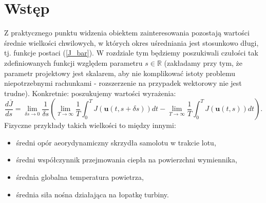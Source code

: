 \documentclass[12pt, twoside]{book}
\begin{document}
\section{Wstęp}
Z praktycznego punktu widzenia obiektem zainteresowania pozostają wartości średnie wielkości chwilowych, w których okres uśredniania jest stosunkowo długi, tj. funkcje postaci (\ref{J_bar}). W rozdziale tym będziemy poszukiwali czułości tak zdefiniowanych funkcji względem parametru $ s \in \mathbb{R} $ (zakładamy przy tym, że parametr projektowy jest skalarem, aby nie komplikować istoty problemu niepotrzebnymi rachunkami - rozszerzenie na przypadek wektorowy nie jest trudne). Konkretnie: poszukujemy wartości wyrażenia:
\begin{equation}
\frac{d\bar{J}}{ds} = \lim\limits_{\delta s \rightarrow 0}\frac{1}{\delta s}(\lim\limits_{T \rightarrow \infty}\frac{1}{T}\int_{0}^{T}J(\textbf{u}(t,s + \delta s))dt - \lim\limits_{T \rightarrow \infty}\frac{1}{T}\int_{0}^{T}J(\textbf{u}(t,s))dt).
\label{J_derivative}
\end{equation}
Fizyczne przykłady takich wielkości to między innymi:
\begin{itemize}
	\item średni opór aeorydynamiczny skrzydła samolotu w trakcie lotu,
	\item średni współczynnik przejmowania ciepła na powierzchni wymiennika,
	\item średnia globalna temperatura powietrza,
	\item średnia siła nośna działająca na łopatkę turbiny.
\end{itemize}
\end{document}
